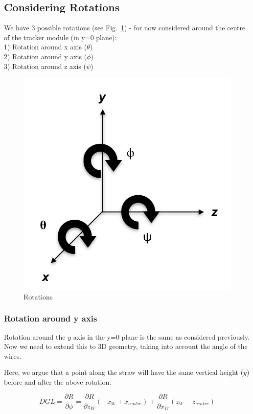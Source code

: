 \documentclass[a4paper,11pt]{article}
\begin{document}
\clearpage
\subsection{Considering Rotations}

We have 3 possible rotations (see Fig.~\ref{fig:Rotation}) - for now considered around the centre of the tracker module (in y=0 plane): \\
1) Rotation around x axis ($\theta$) \\
2) Rotation around y axis ($\phi$) \\
3) Rotation around z axis ($\psi$) \\

\begin{figure}[!ht]
\centering
\includegraphics[width=0.4\linewidth]{fig/rotAxis.png}
\caption{Rotations}
\label{fig:Rotation}
\end{figure}

\subsubsection{Rotation around y axis}

Rotation around the $y$ axis in the y=0 plane is the same as considered previously. Now we need to extend this to 3D geometry, taking into account the angle of the wires. 


Here, we argue that a point along the straw will have the same vertical height ($y$) before and after the above rotation.

\begin{equation}
DGL = \frac{ \partial R}{\partial \phi} = \frac{ \partial R}{\partial z_W} (-x_W + x_{centre}) + \frac{ \partial R}{\partial x_W} (z_W - z_{centre})
\end{equation}
\end{document}
